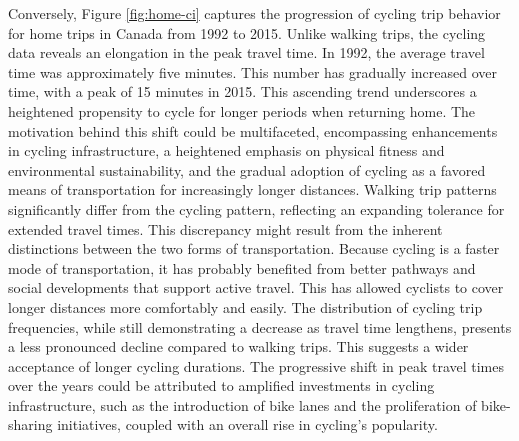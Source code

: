 \documentclass[12pt,twoside]{reedthesis}
\begin{document}
Conversely, Figure \ref{fig:home-ci} captures the progression of cycling trip behavior for home trips in Canada from 1992 to 2015. Unlike walking trips, the cycling data reveals an elongation in the peak travel time. In 1992, the average travel time was approximately five minutes. This number has gradually increased over time, with a peak of 15 minutes in 2015. This ascending trend underscores a heightened propensity to cycle for longer periods when returning home. The motivation behind this shift could be multifaceted, encompassing enhancements in cycling infrastructure, a heightened emphasis on physical fitness and environmental sustainability, and the gradual adoption of cycling as a favored means of transportation for increasingly longer distances. Walking trip patterns significantly differ from the cycling pattern, reflecting an expanding tolerance for extended travel times. This discrepancy might result from the inherent distinctions between the two forms of transportation. Because cycling is a faster mode of transportation, it has probably benefited from better pathways and social developments that support active travel. This has allowed cyclists to cover longer distances more comfortably and easily. The distribution of cycling trip frequencies, while still demonstrating a decrease as travel time lengthens, presents a less pronounced decline compared to walking trips. This suggests a wider acceptance of longer cycling durations. The progressive shift in peak travel times over the years could be attributed to amplified investments in cycling infrastructure, such as the introduction of bike lanes and the proliferation of bike-sharing initiatives, coupled with an overall rise in cycling's popularity.
\end{document}
